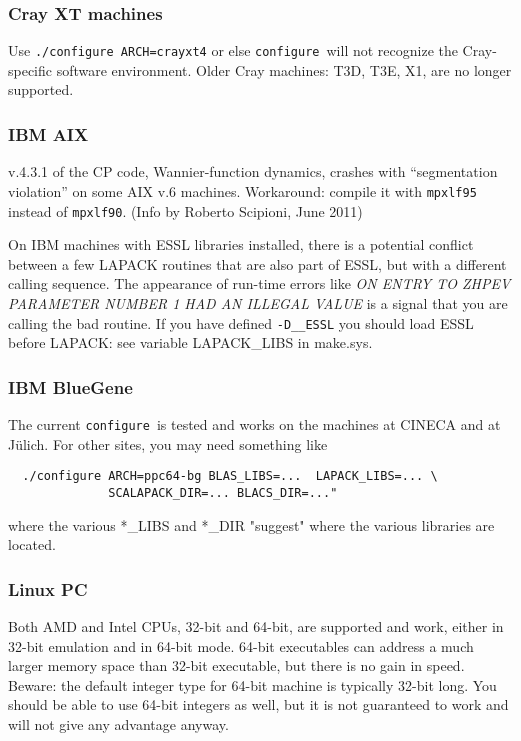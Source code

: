 \documentclass[12pt,a4paper]{article}
\def\configure{\texttt{configure}}
\begin{document}
\subsubsection{Cray XT machines}

Use \texttt{./configure ARCH=crayxt4} or else \configure\ will
not recognize the Cray-specific software environment. Older Cray 
machines: T3D, T3E, X1, are no longer supported.

\subsubsection{IBM AIX}

v.4.3.1 of the CP code, Wannier-function dynamics, crashes with
``segmentation violation'' on some AIX v.6 machines.
Workaround: compile it with \texttt{mpxlf95} instead of 
\texttt{mpxlf90}. (Info by Roberto Scipioni, June 2011)

On IBM machines with ESSL libraries installed, there is a 
potential conflict between a few LAPACK routines that are also part of ESSL, 
but with a different calling sequence. The appearance of run-time errors like {\em
    ON ENTRY TO ZHPEV  PARAMETER NUMBER  1 HAD AN ILLEGAL VALUE}
is a signal that you are calling the bad routine. If you have defined 
\texttt{-D\_\_ESSL} you should load ESSL before LAPACK: see
variable LAPACK\_LIBS in make.sys.

\subsubsection{IBM BlueGene}

The current \configure\ is tested and works on the machines at CINECA 
and at J\"ulich. For other sites, you may need something like
\begin{verbatim}
  ./configure ARCH=ppc64-bg BLAS_LIBS=...  LAPACK_LIBS=... \
              SCALAPACK_DIR=... BLACS_DIR=..."
\end{verbatim}
where the various *\_LIBS and *\_DIR "suggest" where the various libraries 
are located.

\subsubsection{Linux PC}

Both AMD and Intel CPUs, 32-bit and 64-bit, are supported and work,
either in 32-bit emulation and in 64-bit mode. 64-bit executables 
can address a much larger memory space than 32-bit executable, but
there is no gain in speed.
Beware: the default integer type for 64-bit machine is typically
32-bit long. You should be able to use 64-bit integers as well, 
but it is not guaranteed to work and will not give 
any advantage anyway.
\end{document}
